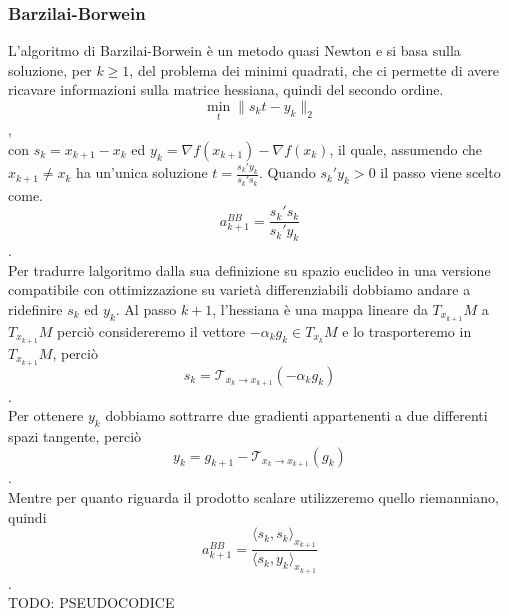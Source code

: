 \documentclass[a4paper, 12pt]{article}
\begin{document}
\subsubsection{Barzilai-Borwein}
L'algoritmo di Barzilai-Borwein è un metodo quasi Newton e si basa sulla soluzione, per $k \geq 1$, del problema dei minimi quadrati, che ci permette di avere ricavare informazioni sulla matrice hessiana, quindi del secondo ordine.\\
\[\min_{t} \parallel s_kt - y_k \parallel_2 \],\\
con $s_k = x_{k+1} - x_k$ ed $y_k = \nabla f(x_{k+1}) - \nabla f(x_k)$, il quale, assumendo che $x_{k+1} \neq x_k$ ha un'unica soluzione $t = \frac{s_k'y_k}{s_k's_k}$. Quando $s_k'y_k > 0$ il passo viene scelto come.\\
\[a_{k+1}^{BB} = \frac{s_k's_k}{s_k'y_k}\].\\
Per tradurre lalgoritmo dalla sua definizione su spazio euclideo in una versione compatibile con ottimizzazione su varietà differenziabili dobbiamo andare a ridefinire $s_k$ ed $y_k$. Al passo $k+1$, l'hessiana è una mappa lineare da $T_{x_{k+1}}M$ a $T_{x_{k+1}}M$ perciò considereremo il vettore $-\alpha_kg_k \in T_{x_k}M$ e lo trasporteremo in $T_{x_{k+1}}M$, perciò\\
\[s_k = \mathcal{T}_{x_k \to x_{k+1}}(-\alpha_kg_k)\].\\
Per ottenere $y_k$ dobbiamo sottrarre due gradienti appartenenti a due differenti spazi tangente, perciò
\[y_k = g_{k+1} - \mathcal{T}_{x_k \to x_{k+1}}(g_k)\].\\
Mentre per quanto riguarda il prodotto scalare utilizzeremo quello riemanniano, quindi\\
\[a_{k+1}^{BB} = \frac{\langle s_k,s_k \rangle_{x_{k+1}}}{\langle s_k,y_k \rangle_{x_{k+1}}}\].\\
TODO: PSEUDOCODICE
\end{document}
